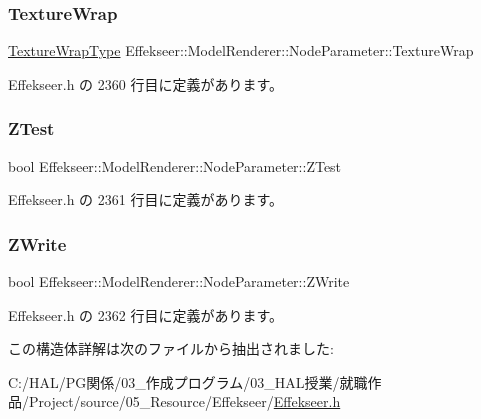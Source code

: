 \subsubsection{\texorpdfstring{Texture\+Wrap}{TextureWrap}}
{\footnotesize\ttfamily \mbox{\hyperlink{namespace_effekseer_a5320c83784602974b6278bf1a77b58a3}{Texture\+Wrap\+Type}} Effekseer\+::\+Model\+Renderer\+::\+Node\+Parameter\+::\+Texture\+Wrap}



 Effekseer.\+h の 2360 行目に定義があります。

\mbox{\label{struct_effekseer_1_1_model_renderer_1_1_node_parameter_a1618ec9d6054c1ab4e7ae3d6aba0c1ea}} 
\subsubsection{\texorpdfstring{Z\+Test}{ZTest}}
{\footnotesize\ttfamily bool Effekseer\+::\+Model\+Renderer\+::\+Node\+Parameter\+::\+Z\+Test}



 Effekseer.\+h の 2361 行目に定義があります。

\mbox{\label{struct_effekseer_1_1_model_renderer_1_1_node_parameter_ad7dee83188011c4dea4313ef0cf21570}} 
\subsubsection{\texorpdfstring{Z\+Write}{ZWrite}}
{\footnotesize\ttfamily bool Effekseer\+::\+Model\+Renderer\+::\+Node\+Parameter\+::\+Z\+Write}



 Effekseer.\+h の 2362 行目に定義があります。



この構造体詳解は次のファイルから抽出されました\+:\begin{DoxyCompactItemize}
\item 
C\+:/\+H\+A\+L/\+P\+G関係/03\+\_\+作成プログラム/03\+\_\+\+H\+A\+L授業/就職作品/\+Project/source/05\+\_\+\+Resource/\+Effekseer/\mbox{\hyperlink{_effekseer_8h}{Effekseer.\+h}}\end{DoxyCompactItemize}
